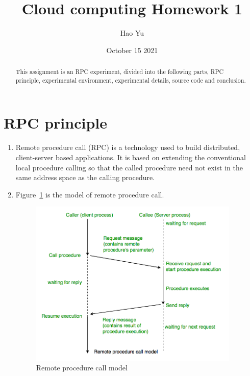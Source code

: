 \documentclass{article}
\title{Cloud computing Homework 1}
\author{Hao Yu}
\date{October 15 2021}
\begin{document}
\maketitle

\begin{abstract}
This assignment is an RPC experiment, divided into the following parts, RPC principle, experimental environment, experimental details, source code and conclusion.
\end{abstract}

\section{RPC principle}\label{sec:rpc-principle}
\begin{enumerate}[label=(\alph*)]
  \item {
    Remote procedure call (RPC) is a technology used to build distributed, client-server based applications.
    It is based on extending the conventional local procedure calling so that the called procedure need not exist in the same address space as the calling procedure.
  }
  \item {
    Figure~\ref{fig:rpc} is the model of remote procedure call.
    \begin{figure}[htp]
        \centering
        \includegraphics[width=10cm]{rpc}
        \caption{Remote procedure call model}
        \label{fig:rpc}
    \end{figure}
  }
\end{enumerate}
\end{document}
